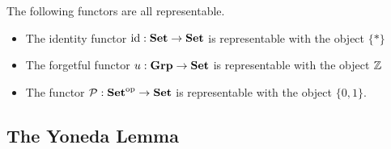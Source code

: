 \documentclass[a4paper]{article}
\begin{document}
\begin{thm}{}{} The following functors are all representable. 
\begin{itemize}
\item The identity functor $\text{id}:\bold{Set}\to\bold{Set}$ is representable with the object $\{\ast\}$
\item The forgetful functor $u:\bold{Grp}\to\bold{Set}$ is representable with the object $\mathbb{Z}$
\item The functor $\mathcal{P}:\bold{Set}^\text{op}\to\bold{Set}$ is representable with the object $\{0,1\}$. 
\end{itemize}
\end{thm}

\subsection{The Yoneda Lemma}
\end{document}

